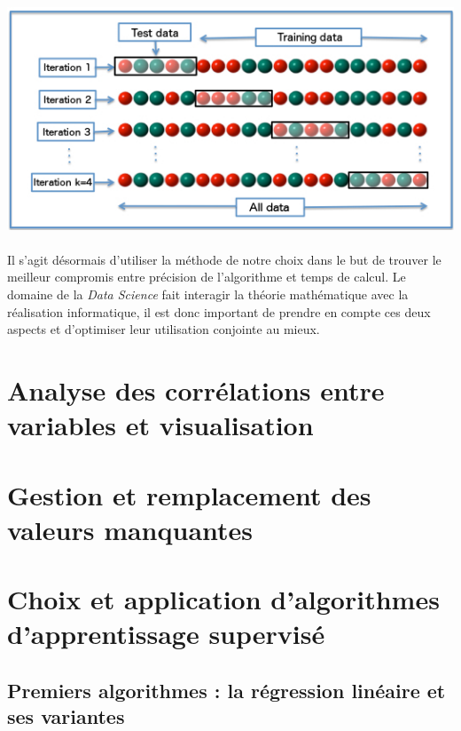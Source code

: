 \documentclass[14pt, openany]{article}
\begin{document}
\paragraph{}
\includegraphics[width=17cm]{Images/k_fold.jpg}
\begin{center}
\label{fig1}
\end{center}
\paragraph{}
Il s'agit désormais d'utiliser la méthode de notre choix dans le but de trouver le meilleur compromis entre précision de l'algorithme et temps de calcul. Le domaine de la \textit{Data Science} fait interagir la théorie mathématique avec la réalisation informatique, il est donc important de prendre en compte ces deux aspects et d'optimiser leur utilisation conjointe au mieux.
\section{Analyse des corrélations entre variables et visualisation}

\section{Gestion et remplacement des valeurs manquantes}

\section{Choix et application d'algorithmes d'apprentissage supervisé}

\subsection{Premiers algorithmes : la régression linéaire et ses variantes}
\end{document}
